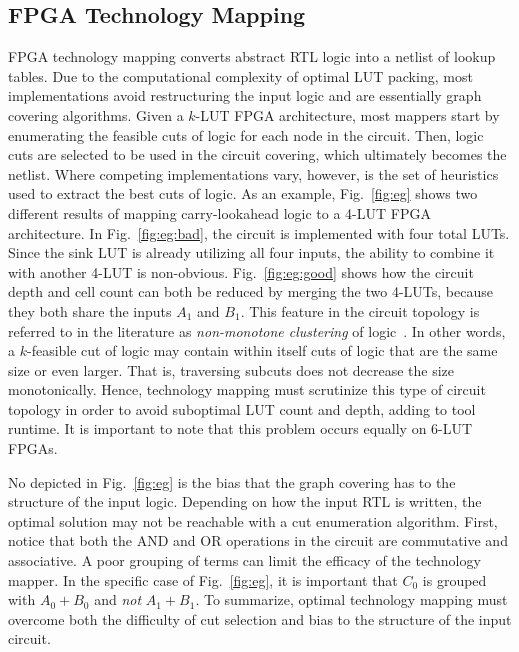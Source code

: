 \subsection{FPGA Technology Mapping}\label{sec:background:fpga}
FPGA technology mapping converts abstract RTL logic into a netlist of lookup
tables. Due to the computational complexity of optimal LUT packing, most
implementations avoid restructuring the input logic and are essentially graph
covering algorithms. Given a $k$-LUT FPGA architecture, most mappers start by
enumerating the feasible cuts of logic for each node in the circuit. Then,
logic cuts are selected to be used in the circuit covering, which ultimately
becomes the netlist. Where competing implementations vary, however, is the set
of heuristics used to extract the best cuts of logic. As an example,
Fig.~\ref{fig:eg} shows two different results of mapping carry-lookahead logic
to a 4-LUT FPGA architecture. In Fig.~\ref{fig:eg:bad}, the circuit is
implemented with four total LUTs. Since the sink LUT is already utilizing all
four inputs, the ability to combine it with another 4-LUT is non-obvious.
Fig.~\ref{fig:eg:good} shows how the circuit depth and cell count can both be
reduced by merging the two 4-LUTs, because they both share the inputs $A_1$ and
$B_1$. This feature in the circuit topology is referred to in the literature as
\textit{non-monotone clustering} of logic~\cite{flowmap}. In other words, a
$k$-feasible cut of logic may contain within itself cuts of logic that are the
same size or even larger. That is, traversing subcuts does not decrease the
size monotonically. Hence, technology mapping must scrutinize this type of
circuit topology in order to avoid suboptimal LUT count and depth, adding to
tool runtime. It is important to note that this problem occurs equally on 6-LUT
FPGAs.

No depicted in Fig.~\ref{fig:eg} is the bias that the graph covering has to the
structure of the input logic. Depending on how the input RTL is written, the
optimal solution may not be reachable with a cut enumeration algorithm. First,
notice that both the AND and OR operations in the circuit are commutative and
associative. A poor grouping of terms can limit the efficacy of the technology
mapper. In the specific case of Fig.~\ref{fig:eg}, it is important that $C_0$
is grouped with $A_0 + B_0$ and \textit{not} $A_1 + B_1$. To summarize, optimal
technology mapping must overcome both the difficulty of cut selection and bias
to the structure of the input circuit.

